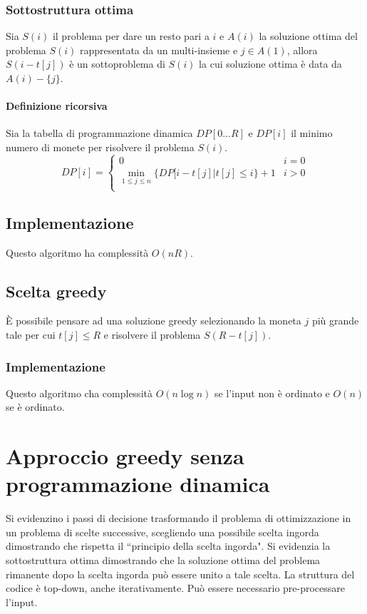 \subsubsection{Sottostruttura ottima}
Sia $S(i)$ il problema per dare un resto pari a $i$ e $A(i)$ la soluzione ottima del problema $S(i)$ rappresentata da un multi-insieme e $j\in A(1)$, allora $S(i-t[j])$ \`e un 
sottoproblema di $S(i)$ la cui soluzione ottima \`e data da $A(i)-\{j\}$. 
\paragraph{Definizione ricorsiva}
Sia la tabella di programmazione dinamica $DP[0\dots R]$ e $DP[i]$ il minimo numero di monete per risolvere il problema $S(i)$.
$$DP[i] = \begin{cases}
	0 & i = 0 \\
	\min\limits_{1\le j\le n}\{DP[i-t[j] | t[j]\le i\} + 1 & i>0\\
\end{cases}$$
\subsection{Implementazione}

Questo algoritmo ha complessit\`a $O(nR)$. 
\subsection{Scelta greedy}
\`E possibile pensare ad una soluzione greedy selezionando la moneta $j$ pi\`u grande tale per cui $t[j]\le R$ e risolvere il problema $S(R - t[j])$. 
\subsubsection{Implementazione}

Questo algoritmo cha complessit\`a $O(n\log n)$ se l'input non \`e ordinato e $O(n)$ se \`e ordinato.
\section{Approccio greedy senza programmazione dinamica}
Si evidenzino i passi di decisione trasformando il problema di ottimizzazione in un problema di scelte successive, scegliendo una possibile scelta ingorda dimostrando che rispetta il
``principio della scelta ingorda". Si evidenzia la sottostruttura ottima dimostrando che la soluzione ottima del problema rimanente dopo la scelta ingorda pu\`o essere unito a tale
scelta. La struttura del codice \`e top-down, anche iterativamente. Pu\`o essere necessario pre-processare l'input. 
